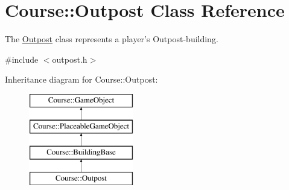 \hypertarget{classCourse_1_1Outpost}{\section{Course\-:\-:Outpost Class Reference}
\label{classCourse_1_1Outpost}
}


The \hyperlink{classCourse_1_1Outpost}{Outpost} class represents a player's Outpost-\/building.  




{\ttfamily \#include $<$outpost.\-h$>$}

Inheritance diagram for Course\-:\-:Outpost\-:\begin{figure}[H]
\begin{center}
\leavevmode
\includegraphics[height=4.000000cm]{classCourse_1_1Outpost}
\end{center}
\end{figure}
